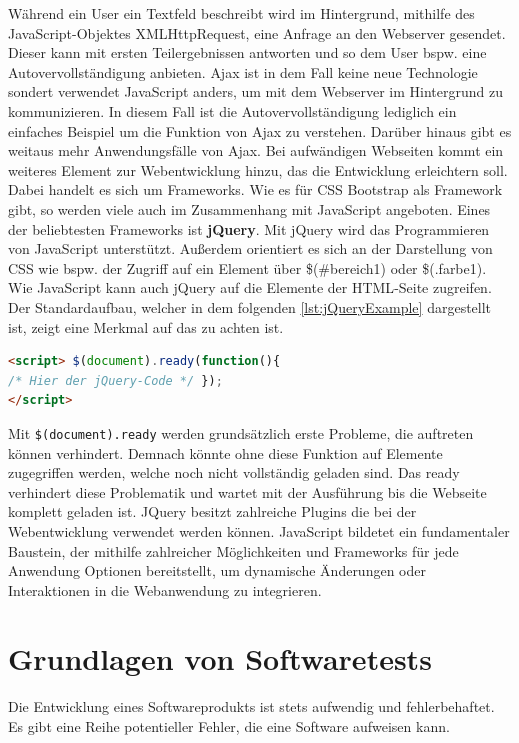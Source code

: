 \documentclass[a4paper,titlepage,halfparskip,12pt]{scrreprt}
\begin{document}
\begin{onehalfspacing}
Während ein User ein Textfeld beschreibt wird im Hintergrund, mithilfe des JavaScript-Objektes XMLHttpRequest, eine Anfrage an den Webserver gesendet. Dieser kann mit ersten Teilergebnissen antworten und so dem User bspw. eine Autovervollständigung anbieten. \ac{Ajax} ist in dem Fall keine neue Technologie sondert verwendet JavaScript anders, um mit dem Webserver im Hintergrund zu kommunizieren. In diesem Fall ist die Autovervollständigung lediglich ein einfaches Beispiel um die Funktion von \ac{Ajax} zu verstehen. Darüber hinaus gibt es weitaus mehr Anwendungsfälle von \ac{Ajax}. Bei aufwändigen Webseiten kommt ein weiteres Element zur Webentwicklung hinzu, das die Entwicklung erleichtern soll. Dabei handelt es sich um Frameworks. Wie es für \ac{CSS} Bootstrap als Framework gibt, so werden viele auch im Zusammenhang mit JavaScript angeboten. Eines der beliebtesten Frameworks ist \textbf{jQuery}. Mit jQuery wird das Programmieren von JavaScript unterstützt. Außerdem orientiert es sich an der Darstellung von \ac{CSS} wie bspw. der Zugriff auf ein Element über \$(\dq \#bereich1\dq) oder \$(\dq .farbe1\dq). Wie JavaScript kann auch jQuery auf die Elemente der \ac{HTML}-Seite zugreifen. Der Standardaufbau, welcher in dem folgenden \autoref{lst:jQueryExample} dargestellt ist, zeigt eine Merkmal auf das zu achten ist.
\begin{lstlisting}[language=HTML,caption=Example Listing of jQuery,label={lst:jQueryExample}]
<script> $(document).ready(function(){
/* Hier der jQuery-Code */ });
</script>
\end{lstlisting}
Mit \texttt{\$(document).ready} werden grundsätzlich erste Probleme, die auftreten können verhindert. Demnach könnte ohne diese Funktion auf Elemente zugegriffen werden, welche noch nicht vollständig geladen sind. Das ready verhindert diese Problematik und wartet mit der Ausführung bis die Webseite komplett geladen ist. JQuery besitzt zahlreiche Plugins die bei der Webentwicklung verwendet werden können. JavaScript bildetet ein fundamentaler Baustein, der mithilfe zahlreicher Möglichkeiten und Frameworks für jede Anwendung Optionen bereitstellt, um dynamische Änderungen oder Interaktionen in die Webanwendung zu integrieren.\cite{buhler2018webtechnologien}


\pagebreak
\section{Grundlagen von Softwaretests}
\label{sec:GrundlagenSoftwaretests}

Die Entwicklung eines Softwareprodukts ist stets aufwendig und fehlerbehaftet. Es gibt eine Reihe potentieller Fehler, die eine Software aufweisen kann.


\end{onehalfspacing}
\end{document}
